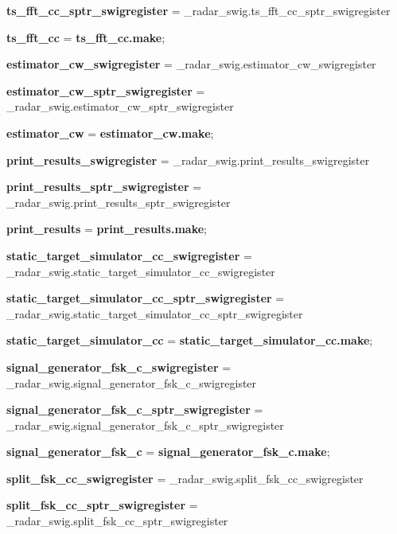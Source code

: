 \begin{DoxyCompactItemize}
\item 
{\bf ts\+\_\+fft\+\_\+cc\+\_\+sptr\+\_\+swigregister} = \+\_\+radar\+\_\+swig.\+ts\+\_\+fft\+\_\+cc\+\_\+sptr\+\_\+swigregister
\item 
{\bf ts\+\_\+fft\+\_\+cc} = {\bf ts\+\_\+fft\+\_\+cc.\+make};
\item 
{\bf estimator\+\_\+cw\+\_\+swigregister} = \+\_\+radar\+\_\+swig.\+estimator\+\_\+cw\+\_\+swigregister
\item 
{\bf estimator\+\_\+cw\+\_\+sptr\+\_\+swigregister} = \+\_\+radar\+\_\+swig.\+estimator\+\_\+cw\+\_\+sptr\+\_\+swigregister
\item 
{\bf estimator\+\_\+cw} = {\bf estimator\+\_\+cw.\+make};
\item 
{\bf print\+\_\+results\+\_\+swigregister} = \+\_\+radar\+\_\+swig.\+print\+\_\+results\+\_\+swigregister
\item 
{\bf print\+\_\+results\+\_\+sptr\+\_\+swigregister} = \+\_\+radar\+\_\+swig.\+print\+\_\+results\+\_\+sptr\+\_\+swigregister
\item 
{\bf print\+\_\+results} = {\bf print\+\_\+results.\+make};
\item 
{\bf static\+\_\+target\+\_\+simulator\+\_\+cc\+\_\+swigregister} = \+\_\+radar\+\_\+swig.\+static\+\_\+target\+\_\+simulator\+\_\+cc\+\_\+swigregister
\item 
{\bf static\+\_\+target\+\_\+simulator\+\_\+cc\+\_\+sptr\+\_\+swigregister} = \+\_\+radar\+\_\+swig.\+static\+\_\+target\+\_\+simulator\+\_\+cc\+\_\+sptr\+\_\+swigregister
\item 
{\bf static\+\_\+target\+\_\+simulator\+\_\+cc} = {\bf static\+\_\+target\+\_\+simulator\+\_\+cc.\+make};
\item 
{\bf signal\+\_\+generator\+\_\+fsk\+\_\+c\+\_\+swigregister} = \+\_\+radar\+\_\+swig.\+signal\+\_\+generator\+\_\+fsk\+\_\+c\+\_\+swigregister
\item 
{\bf signal\+\_\+generator\+\_\+fsk\+\_\+c\+\_\+sptr\+\_\+swigregister} = \+\_\+radar\+\_\+swig.\+signal\+\_\+generator\+\_\+fsk\+\_\+c\+\_\+sptr\+\_\+swigregister
\item 
{\bf signal\+\_\+generator\+\_\+fsk\+\_\+c} = {\bf signal\+\_\+generator\+\_\+fsk\+\_\+c.\+make};
\item 
{\bf split\+\_\+fsk\+\_\+cc\+\_\+swigregister} = \+\_\+radar\+\_\+swig.\+split\+\_\+fsk\+\_\+cc\+\_\+swigregister
\item 
{\bf split\+\_\+fsk\+\_\+cc\+\_\+sptr\+\_\+swigregister} = \+\_\+radar\+\_\+swig.\+split\+\_\+fsk\+\_\+cc\+\_\+sptr\+\_\+swigregister

\end{DoxyCompactItemize}
